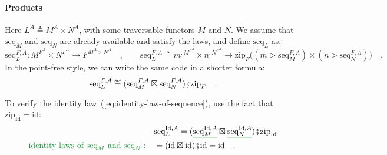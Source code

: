 \paragraph{Products}

Here $L^{A}\triangleq M^{A}\times N^{A}$, with some traversable functors
$M$ and $N$. We assume that $\text{seq}_{M}$ and $\text{seq}_{N}$
are already available and satisfy the laws, and define $\text{seq}_{L}$
as:
\[
\text{seq}_{L}^{F,A}:M^{F^{A}}\times N^{F^{A}}\rightarrow F^{M^{A}\times N^{A}}\quad,\quad\quad\text{seq}_{L}^{F,A}\triangleq m^{:M^{F^{A}}}\times n^{:N^{F^{A}}}\rightarrow\text{zip}_{F}\big((m\triangleright\text{seq}_{M}^{F,A})\times(n\triangleright\text{seq}_{N}^{F,A})\big)\quad.
\]
In the point-free style, we can write the same code in a shorter formula:
\[
\text{seq}_{L}^{F,A}\triangleq(\text{seq}_{M}^{F,A}\boxtimes\text{seq}_{N}^{F,A})\bef\text{zip}_{F}\quad.
\]

To verify the identity law~(\ref{eq:identity-law-of-sequence}),
use the fact that $\text{zip}_{\text{Id}}=\text{id}$:
\begin{align*}
 & \text{seq}_{L}^{\text{Id},A}=(\gunderline{\text{seq}_{M}^{\text{Id},A}}\boxtimes\gunderline{\text{seq}_{N}^{\text{Id},A}})\bef\text{zip}_{\text{Id}}\\
{\color{greenunder}\text{identity laws of }\text{seq}_{M}\text{ and }\text{seq}_{N}:}\quad & =(\text{id}\boxtimes\text{id})\bef\text{id}=\text{id}\quad.
\end{align*}

